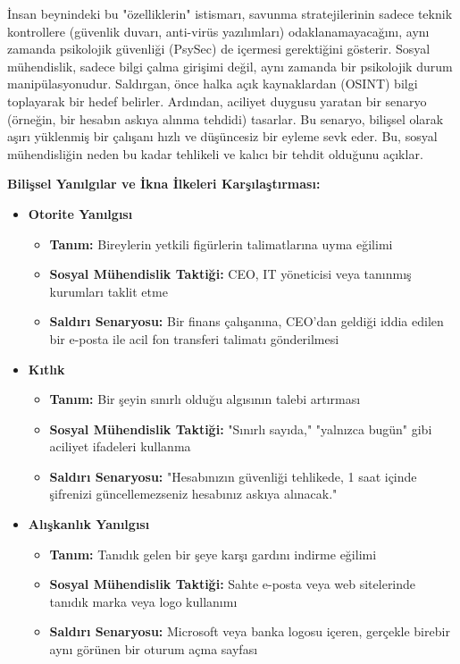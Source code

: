 İnsan beynindeki bu "özelliklerin" istismarı, savunma stratejilerinin sadece teknik kontrollere (güvenlik duvarı, anti-virüs yazılımları) odaklanamayacağını, aynı zamanda psikolojik güvenliği (PsySec) de içermesi gerektiğini gösterir. Sosyal mühendislik, sadece bilgi çalma girişimi değil, aynı zamanda bir psikolojik durum manipülasyonudur. Saldırgan, önce halka açık kaynaklardan (OSINT) bilgi toplayarak bir hedef belirler. Ardından, aciliyet duygusu yaratan bir senaryo (örneğin, bir hesabın askıya alınma tehdidi) tasarlar. Bu senaryo, bilişsel olarak aşırı yüklenmiş bir çalışanı hızlı ve düşüncesiz bir eyleme sevk eder. Bu, sosyal mühendisliğin neden bu kadar tehlikeli ve kalıcı bir tehdit olduğunu açıklar.

\textbf{Bilişsel Yanılgılar ve İkna İlkeleri Karşılaştırması:}

\begin{itemize}
    \item \textbf{Otorite Yanılgısı}
    \begin{itemize}
        \item \textbf{Tanım:} Bireylerin yetkili figürlerin talimatlarına uyma eğilimi
        \item \textbf{Sosyal Mühendislik Taktiği:} CEO, IT yöneticisi veya tanınmış kurumları taklit etme
        \item \textbf{Saldırı Senaryosu:} Bir finans çalışanına, CEO'dan geldiği iddia edilen bir e-posta ile acil fon transferi talimatı gönderilmesi
    \end{itemize}
    
    \item \textbf{Kıtlık}
    \begin{itemize}
        \item \textbf{Tanım:} Bir şeyin sınırlı olduğu algısının talebi artırması
        \item \textbf{Sosyal Mühendislik Taktiği:} "Sınırlı sayıda," "yalnızca bugün" gibi aciliyet ifadeleri kullanma
        \item \textbf{Saldırı Senaryosu:} "Hesabınızın güvenliği tehlikede, 1 saat içinde şifrenizi güncellemezseniz hesabınız askıya alınacak."
    \end{itemize}
    
    \item \textbf{Alışkanlık Yanılgısı}
    \begin{itemize}
        \item \textbf{Tanım:} Tanıdık gelen bir şeye karşı gardını indirme eğilimi
        \item \textbf{Sosyal Mühendislik Taktiği:} Sahte e-posta veya web sitelerinde tanıdık marka veya logo kullanımı
        \item \textbf{Saldırı Senaryosu:} Microsoft veya banka logosu içeren, gerçekle birebir aynı görünen bir oturum açma sayfası
    \end{itemize}
    

\end{itemize}
